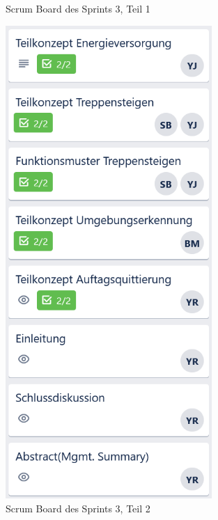 \begin{figure}[H]
\begin{minipage}[t]{0.45\linewidth}
  \caption{Scrum Board des Sprints 3, Teil 1}
  \label{Scrum Board 3.1}
  \end{minipage} 
  \hfill
  \begin{minipage}[t]{0.45\linewidth}
  \includegraphics[width=0.7\textwidth]{img/Trello/Trello-Bord_3_Nr2.PNG}
  \caption{Scrum Board des Sprints 3, Teil 2}
  \label{Scrum Board 3.2}
  \end{minipage}
\end{figure}